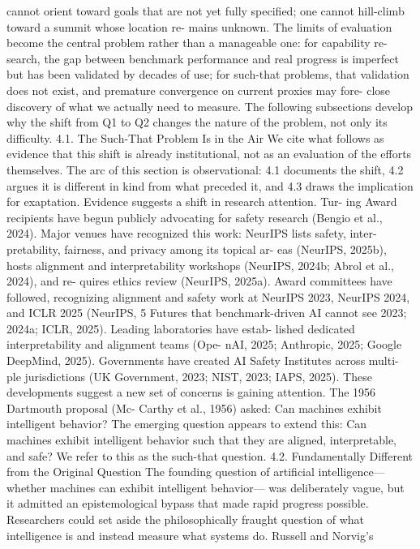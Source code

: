cannot orient toward goals that are not yet fully specified;
one cannot hill-climb toward a summit whose location re-
mains unknown. The limits of evaluation become the central
problem rather than a manageable one: for capability re-
search, the gap between benchmark performance and real
progress is imperfect but has been validated by decades of
use; for such-that problems, that validation does not exist,
and premature convergence on current proxies may fore-
close discovery of what we actually need to measure. The
following subsections develop why the shift from Q1 to Q2
changes the nature of the problem, not only its difficulty.
4.1. The Such-That Problem Is in the Air
We cite what follows as evidence that this shift is already
institutional, not as an evaluation of the efforts themselves.
The arc of this section is observational: 4.1 documents the
shift, 4.2 argues it is different in kind from what preceded it,
and 4.3 draws the implication for exaptation.
Evidence suggests a shift in research attention.
Tur-
ing Award recipients have begun publicly advocating for
safety research (Bengio et al., 2024).
Major venues
have recognized this work: NeurIPS lists safety, inter-
pretability, fairness, and privacy among its topical ar-
eas (NeurIPS, 2025b), hosts alignment and interpretability
workshops (NeurIPS, 2024b; Abrol et al., 2024), and re-
quires ethics review (NeurIPS, 2025a). Award committees
have followed, recognizing alignment and safety work at
NeurIPS 2023, NeurIPS 2024, and ICLR 2025 (NeurIPS,
5
Futures that benchmark-driven AI cannot see
2023; 2024a; ICLR, 2025). Leading laboratories have estab-
lished dedicated interpretability and alignment teams (Ope-
nAI, 2025; Anthropic, 2025; Google DeepMind, 2025).
Governments have created AI Safety Institutes across multi-
ple jurisdictions (UK Government, 2023; NIST, 2023; IAPS,
2025). These developments suggest a new set of concerns
is gaining attention. The 1956 Dartmouth proposal (Mc-
Carthy et al., 1956) asked: Can machines exhibit intelligent
behavior? The emerging question appears to extend this:
Can machines exhibit intelligent behavior such that they
are aligned, interpretable, and safe? We refer to this as the
such-that question.
4.2. Fundamentally Different from the Original
Question
The founding question of artificial intelligence—whether
machines can exhibit intelligent behavior— was deliberately
vague, but it admitted an epistemological bypass that made
rapid progress possible. Researchers could set aside the
philosophically fraught question of what intelligence is and
instead measure what systems do. Russell and Norvig’s
